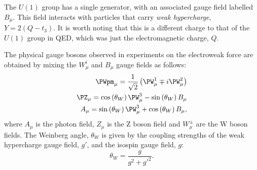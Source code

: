 The $U(1)$ group has a single generator, with an associated gauge
field labelled $B_{\mu}$. This field interacts with particles that
carry \emph{weak hypercharge}, $Y=2(Q-t_3)$. It is worth noting that this
is a different charge to that of the $U(1)$ group in \ac{QED}, which was
just the electromagnetic charge, $Q$. 

The physical gauge bosons observed in experiments on the electroweak
force are obtained by mixing the $W_{\mu}^i$ and $B_{\mu}$ gauge
fields as follows:
\begin{equation}
  \begin{split}
  \PWpm_{\mu}=\frac{1}{\sqrt{2}}\left(\PW^{1}_{\mu}\mp i\PW^{2}_{\mu}\right) \\
  \PZ_{\mu}=\cos\left(\theta_{W}\right)\PW^{3}_{\mu}-\sin\left(\theta_{W}\right)B_{\mu} \\
  A_{\mu}=\sin\left(\theta_{W}\right)\PW^{3}_{\mu}+\cos\left(\theta_{W}\right)B_{\mu},
  \end{split}
\end{equation}
where $A_{\mu}$ is the photon field, $Z_{\mu}$ is the Z boson field
and $W^{\pm}_{\mu}$ are the W boson fields. The Weinberg angle,
$\theta_W$ is given by the coupling strengths of the weak hypercharge
gauge field, $g'$, and the isospin gauge field, $g$:
\begin{equation}
\theta_W = \frac{g}{g^2+g'^2}.
\end{equation}







